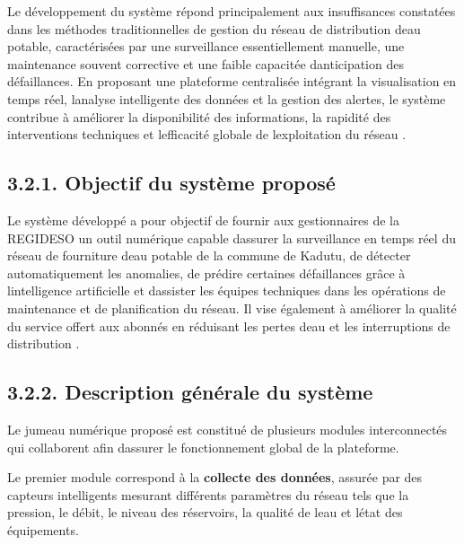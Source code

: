 \documentclass[12pt,a4paper,oneside]{report}
\begin{document}
Le développement du système répond principalement aux insuffisances
constatées dans les méthodes traditionnelles de gestion du réseau de
distribution d\textquotesingle eau potable, caractérisées par une
surveillance essentiellement manuelle, une maintenance souvent
corrective et une faible capacitée d\textquotesingle anticipation des
défaillances. En proposant une plateforme centralisée intégrant la
visualisation en temps réel, l\textquotesingle analyse intelligente des
données et la gestion des alertes, le système contribue à améliorer la
disponibilité des informations, la rapidité des interventions techniques
et l\textquotesingle efficacité globale de
l\textquotesingle exploitation du réseau \cite{ref20}.

\subsection{\texorpdfstring{\textbf{3.2.1. Objectif du système
proposé}}{3.2.1. Objectif du système proposé}}\label{objectif-du-systuxe8me-proposuxe9}

Le système développé a pour objectif de fournir aux gestionnaires de la
REGIDESO un outil numérique capable d\textquotesingle assurer la
surveillance en temps réel du réseau de fourniture d\textquotesingle eau
potable de la commune de Kadutu, de détecter automatiquement les
anomalies, de prédire certaines défaillances grâce à
l\textquotesingle intelligence artificielle et
d\textquotesingle assister les équipes techniques dans les opérations de
maintenance et de planification du réseau. Il vise également à améliorer
la qualité du service offert aux abonnés en réduisant les pertes
d\textquotesingle eau et les interruptions de distribution \cite{ref17}.

\subsection{\texorpdfstring{\textbf{3.2.2. Description générale du
système}}{3.2.2. Description générale du système}}\label{description-guxe9nuxe9rale-du-systuxe8me}

Le jumeau numérique proposé est constitué de plusieurs modules
interconnectés qui collaborent afin d\textquotesingle assurer le
fonctionnement global de la plateforme.

Le premier module correspond à la \textbf{collecte des données}, assurée
par des capteurs intelligents mesurant différents paramètres du réseau
tels que la pression, le débit, le niveau des réservoirs, la qualité de
l\textquotesingle eau et l\textquotesingle état des équipements.
\end{document}

